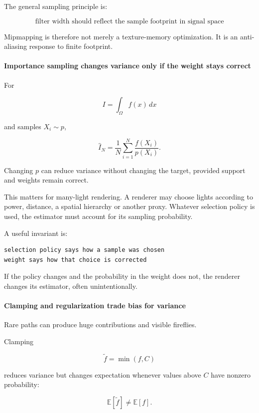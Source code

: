 The general sampling principle is:

\[
\boxed{
\text{filter width should reflect the sample footprint in signal space}
}
\]

Mipmapping is therefore not merely a texture-memory optimization. It is an anti-aliasing response to finite footprint.

\paragraph{Importance sampling changes variance only if the weight stays correct}\label{importance-sampling-changes-variance-only-if-the-weight-stays-correct}

For

\[
I=\int_\Omega f(x)\,dx
\]

and samples \(X_i\sim p\),

\[
\widehat I_N=
\frac1N
\sum_{i=1}^{N}
\frac{f(X_i)}{p(X_i)}.
\]

Changing \(p\) can reduce variance without changing the target, provided support and weights remain correct.

This matters for many-light rendering. A renderer may choose lights according to power, distance, a spatial hierarchy or another proxy. Whatever selection policy is used, the estimator must account for its sampling probability.

A useful invariant is:

\begin{verbatim}
selection policy says how a sample was chosen
weight says how that choice is corrected
\end{verbatim}

If the policy changes and the probability in the weight does not, the renderer changes its estimator, often unintentionally.

\paragraph{Clamping and regularization trade bias for variance}\label{clamping-and-regularization-trade-bias-for-variance}

Rare paths can produce huge contributions and visible fireflies.

Clamping

\[
\widetilde f=\min(f,C)
\]

reduces variance but changes expectation whenever values above \(C\) have nonzero probability:

\[
\mathbb E[\widetilde f]\neq\mathbb E[f].
\]

